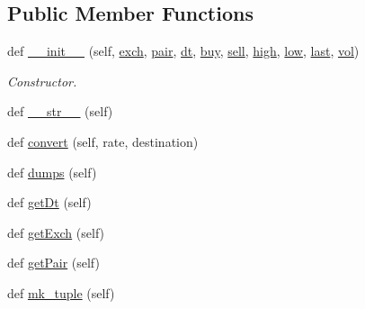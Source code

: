 \subsection*{Public Member Functions}
\begin{DoxyCompactItemize}
\item 
def \hyperlink{classexchange_1_1_ticker_a4a8c99ada461a4aeb960c14020a47736}{\+\_\+\+\_\+init\+\_\+\+\_\+} (self, \hyperlink{classexchange_1_1_ticker_a33f33fe9a12da3ce52938afdc577c061}{exch}, \hyperlink{classexchange_1_1_ticker_a382f9199d13a7b5929a26065fad4e491}{pair}, \hyperlink{classexchange_1_1_ticker_a45e3162d9956cee797f21d93c44c6baf}{dt}, \hyperlink{classexchange_1_1_ticker_a2ca48c3fa9aba92241392a05bef39324}{buy}, \hyperlink{classexchange_1_1_ticker_a5ba9e257d2ed28f02528a37d9ebd793e}{sell}, \hyperlink{classexchange_1_1_ticker_aace381ca15468df6a40e8d86b7710a7f}{high}, \hyperlink{classexchange_1_1_ticker_a1c1f26a47a82fc799fcebf158e104405}{low}, \hyperlink{classexchange_1_1_ticker_add7c2d95fa790dcdffddae2e584ce5f5}{last}, \hyperlink{classexchange_1_1_ticker_a24c0dd396aebc54c06e429a68c964ea3}{vol})
\begin{DoxyCompactList}\small\item\em Constructor. \end{DoxyCompactList}\item 
def \hyperlink{classexchange_1_1_ticker_af91836a1c408f54dda95d9865cefba45}{\+\_\+\+\_\+str\+\_\+\+\_\+} (self)
\item 
def \hyperlink{classexchange_1_1_ticker_a2aa851437f953462f8e8bce7ca05c3ec}{convert} (self, rate, destination)
\item 
def \hyperlink{classexchange_1_1_ticker_a53148d54a0b9b577870db785fb4e381e}{dumps} (self)
\item 
def \hyperlink{classexchange_1_1_ticker_aaa2f7d66782b9405c286e98bfb281d45}{get\+Dt} (self)
\item 
def \hyperlink{classexchange_1_1_ticker_ab31537c5a057f9a47839e2d28411c1cf}{get\+Exch} (self)
\item 
def \hyperlink{classexchange_1_1_ticker_a3600faedb720e664d6fdc89415c01678}{get\+Pair} (self)
\item 
def \hyperlink{classexchange_1_1_ticker_aba1398da3113a7ff17b2496ce92c7238}{mk\+\_\+tuple} (self)
\end{DoxyCompactItemize}
